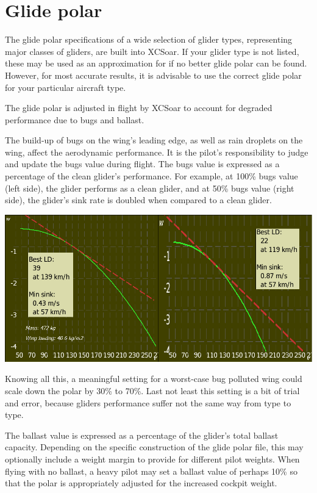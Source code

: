 \documentclass[a4paper,12pt]{refrep}
\begin{document}
\section{Glide polar}

The glide polar specifications of a wide selection of glider types,
representing major classes of gliders, are built into XCSoar.
If your glider type is not listed, these may be used as an approximation for  
if no better glide polar can be found.  However, for most accurate results, it is
advisable to use the correct glide polar for your particular
 aircraft type. 

The glide polar is adjusted in flight by XCSoar to account for
degraded performance due to bugs and ballast.

The build-up of bugs on the wing's leading edge, as well as rain
droplets on the wing, affect the aerodynamic performance.  It is the
pilot's responsibility to judge and update the bugs value during
flight.  The bugs value is expressed as a percentage of the clean
glider's performance.  For example, at 100\% bugs value (left side), the glider
performs as a clean glider, and at 50\% bugs value (right side), the glider's
sink rate is doubled when compared to a clean glider. 

\begin{center}
\includegraphics[angle=0,width=\linewidth,keepaspectratio='true']{figures/cut-clean-dirty-polar.png}
\end{center}
Knowing all this, a meaningful setting for a worst-case bug polluted wing could
scale down the polar by 30\% to 70\%. Last not least this setting is a bit of 
trial and error, because gliders performance suffer not the same way from type
to type.

The ballast value is expressed as a percentage of the glider's total
ballast capacity.  Depending on the specific construction of the glide
polar file, this may optionally include a weight margin to provide for
different pilot weights.  When flying with no ballast, a heavy pilot
may set a ballast value of perhaps 10\% so that the polar is
appropriately adjusted for the increased cockpit weight.
\end{document}

